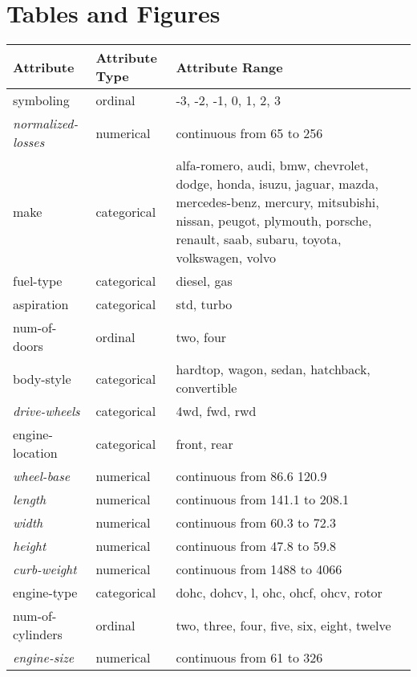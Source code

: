 
\section{Tables and Figures}
\listoftables
\listoffigures
\begin{sidewaystable}[hbpt]
 \centering
 \begin{tabularx}{\textwidth}{l l X }\toprule
\textbf{Attribute}              & \textbf{Attribute Type} &  \textbf{Attribute Range} \\\midrule
symboling               & ordinal     & -3, -2, -1, 0, 1, 2, 3 \\
\emph{normalized-losses}       & numerical   & continuous from 65 to 256\\
make                    & categorical & alfa-romero, audi, bmw, chevrolet, dodge, honda,
                               isuzu, jaguar, mazda, mercedes-benz, mercury,
                               mitsubishi, nissan, peugot, plymouth, porsche,
                               renault, saab, subaru, toyota, volkswagen, volvo\\
fuel-type               &categorical  &diesel, gas\\
aspiration              &categorical &std, turbo\\
num-of-doors            &ordinal & two, four\\
body-style              &categorical &hardtop, wagon, sedan, hatchback, convertible\\
\emph{drive-wheels}            &categorical &4wd, fwd, rwd\\
engine-location         &categorical &front, rear\\
\emph{wheel-base}              &numerical &continuous from 86.6 120.9\\
\emph{length}                   &numerical &continuous from 141.1 to 208.1\\
\emph{width}                    &numerical &continuous from 60.3 to 72.3\\
\emph{height}                   &numerical &continuous from 47.8 to 59.8\\
\emph{curb-weight}              &numerical &continuous from 1488 to 4066\\
engine-type             &categorical &dohc, dohcv, l, ohc, ohcf, ohcv, rotor\\
num-of-cylinders        &ordinal &two, three, four, five, six, eight, twelve\\
\emph{engine-size}              &numerical &continuous from 61 to 326\\

\end{tabularx}
\end{sidewaystable}
